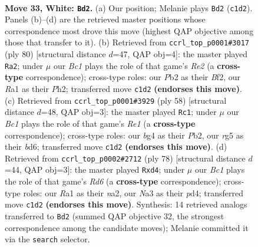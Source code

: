 \documentclass[11pt]{article}
\begin{document}
\clearpage

\begin{figure}[p]\centering
\begin{subfigure}{0.46\textwidth}\centering
\resizebox{\linewidth}{!}{%
\newchessgame
\chessboard[
  setfen={1r6/pp4k1/8/2p3r1/4p1b1/N3P3/PP4K1/R1B5 w - - 0 33},
  showmover=false,
  pgfstyle=straightmove, color=movearrow, markmove={c1-d2}
]}
\caption{}
\end{subfigure}\hfill
\begin{subfigure}{0.46\textwidth}\centering
\resizebox{\linewidth}{!}{%
\newchessgame
\chessboard[
  setfen={8/1p1r1k1p/1P1b2p1/5p2/2K2P2/6P1/4RB1P/8 w - - 10 41},
  showmover=false,
  pgfstyle=straightmove, color=movearrow, markmove={e2-a2}
]}
\caption{}
\end{subfigure}
\\[4pt]
\begin{subfigure}{0.46\textwidth}\centering
\resizebox{\linewidth}{!}{%
\newchessgame
\chessboard[
  setfen={3r1k2/pp3p2/3b2p1/8/8/4NP1P/PP3P2/4R1K1 w - - 0 30},
  showmover=false,
  pgfstyle=straightmove, color=movearrow, markmove={e1-c1}
]}
\caption{}
\end{subfigure}\hfill
\begin{subfigure}{0.46\textwidth}\centering
\resizebox{\linewidth}{!}{%
\newchessgame
\chessboard[
  setfen={5r1k/7p/2BR1p2/p4P2/2Pp4/7P/n5P1/6K1 w - - 0 40},
  showmover=false,
  pgfstyle=straightmove, color=movearrow, markmove={d6-d4}
]}
\caption{}
\end{subfigure}
\caption{\textbf{Move 33, White: \texttt{Bd2}.} (a) Our position; Melanie plays \texttt{Bd2} (\texttt{c1d2}). Panels (b)--(d) are the retrieved master positions whose correspondence most drove this move (highest QAP objective among those that transfer to it). (b) Retrieved from \texttt{ccrl\_top\_p0001\#3017} (ply 80) [structural distance $d$=47, QAP obj=4]: the master played \texttt{Ra2}; under $\mu$ our \emph{Bc1} plays the role of that game's \emph{Re2} (a \textbf{cross-type} correspondence); cross-type roles: our \emph{P}b2 as their \emph{B}f2, our \emph{R}a1 as their \emph{P}h2; transferred move \texttt{c1d2} \textbf{(endorses this move)}. (c) Retrieved from \texttt{ccrl\_top\_p0001\#3929} (ply 58) [structural distance $d$=48, QAP obj=3]: the master played \texttt{Rc1}; under $\mu$ our \emph{Bc1} plays the role of that game's \emph{Re1} (a \textbf{cross-type} correspondence); cross-type roles: our \emph{b}g4 as their \emph{P}b2, our \emph{r}g5 as their \emph{b}d6; transferred move \texttt{c1d2} \textbf{(endorses this move)}. (d) Retrieved from \texttt{ccrl\_top\_p0002\#2712} (ply 78) [structural distance $d$=44, QAP obj=3]: the master played \texttt{Rxd4}; under $\mu$ our \emph{Bc1} plays the role of that game's \emph{Rd6} (a \textbf{cross-type} correspondence); cross-type roles: our \emph{R}a1 as their \emph{n}a2, our \emph{N}a3 as their \emph{p}d4; transferred move \texttt{c1d2} \textbf{(endorses this move)}. Synthesis: 14 retrieved analogs transferred to \texttt{Bd2} (summed QAP objective 32, the strongest correspondence among the candidate moves); Melanie committed it via the \texttt{search} selector.}
\label{fig:thought-m64}
\end{figure}
\end{document}

